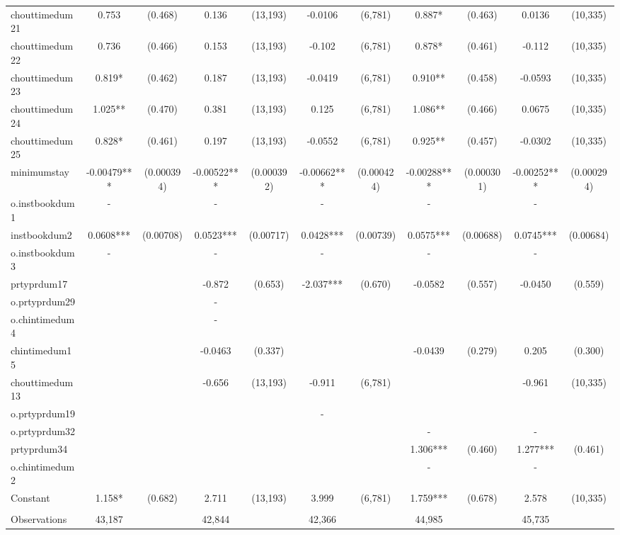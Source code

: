 \documentclass[]{article}
\begin{document}
\begin{tabular}{lcccccccccc}
chouttimedum21 & 0.753 & (0.468) & 0.136 & (13,193) & -0.0106 & (6,781) & 0.887* & (0.463) & 0.0136 & (10,335) \\
chouttimedum22 & 0.736 & (0.466) & 0.153 & (13,193) & -0.102 & (6,781) & 0.878* & (0.461) & -0.112 & (10,335) \\
chouttimedum23 & 0.819* & (0.462) & 0.187 & (13,193) & -0.0419 & (6,781) & 0.910** & (0.458) & -0.0593 & (10,335) \\
chouttimedum24 & 1.025** & (0.470) & 0.381 & (13,193) & 0.125 & (6,781) & 1.086** & (0.466) & 0.0675 & (10,335) \\
chouttimedum25 & 0.828* & (0.461) & 0.197 & (13,193) & -0.0552 & (6,781) & 0.925** & (0.457) & -0.0302 & (10,335) \\
minimumstay & -0.00479*** & (0.000394) & -0.00522*** & (0.000392) & -0.00662*** & (0.000424) & -0.00288*** & (0.000301) & -0.00252*** & (0.000294) \\
o.instbookdum1 & - &  & - &  & - &  & - &  & - &  \\
instbookdum2 & 0.0608*** & (0.00708) & 0.0523*** & (0.00717) & 0.0428*** & (0.00739) & 0.0575*** & (0.00688) & 0.0745*** & (0.00684) \\
o.instbookdum3 & - &  & - &  & - &  & - &  & - &  \\
prtyprdum17 &  &  & -0.872 & (0.653) & -2.037*** & (0.670) & -0.0582 & (0.557) & -0.0450 & (0.559) \\
o.prtyprdum29 &  &  & - &  &  &  &  &  &  &  \\
o.chintimedum4 &  &  & - &  &  &  &  &  &  &  \\
chintimedum15 &  &  & -0.0463 & (0.337) &  &  & -0.0439 & (0.279) & 0.205 & (0.300) \\
chouttimedum13 &  &  & -0.656 & (13,193) & -0.911 & (6,781) &  &  & -0.961 & (10,335) \\
o.prtyprdum19 &  &  &  &  & - &  &  &  &  &  \\
o.prtyprdum32 &  &  &  &  &  &  & - &  & - &  \\
prtyprdum34 &  &  &  &  &  &  & 1.306*** & (0.460) & 1.277*** & (0.461) \\
o.chintimedum2 &  &  &  &  &  &  & - &  & - &  \\
Constant & 1.158* & (0.682) & 2.711 & (13,193) & 3.999 & (6,781) & 1.759*** & (0.678) & 2.578 & (10,335) \\
 &  &  &  &  &  &  &  &  &  &  \\
Observations & 43,187 &  & 42,844 &  & 42,366 &  & 44,985 &  & 45,735 &  \\

\end{tabular}
\end{document}
